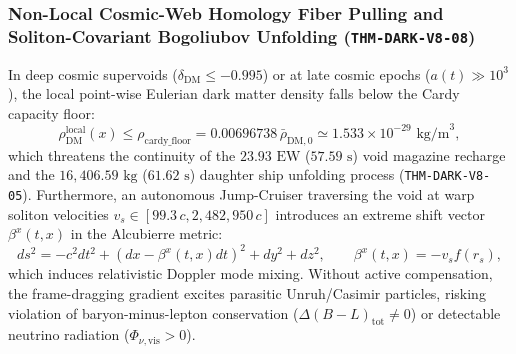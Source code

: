 \documentclass[11pt,onecolumn]{article}
\begin{document}
\subsubsection{Non-Local Cosmic-Web Homology Fiber Pulling and Soliton-Covariant Bogoliubov Unfolding (\texttt{THM-DARK-V8-08})}
\label{subsubsec:thm_dark_v8_08}

In deep cosmic supervoids ($\delta_{\text{DM}} \le -0.995$) or at late cosmic epochs ($a(t) \gg 10^3$), the local point-wise Eulerian dark matter density falls below the Cardy capacity floor:
\begin{equation}
\rho_{\text{DM}}^{\text{local}}(x) \le \rho_{\text{cardy\_floor}} = 0.00696738\,\bar{\rho}_{\text{DM},0} \simeq 1.533 \times 10^{-29}\text{ kg/m}^3,
\end{equation}
which threatens the continuity of the $23.93\text{ EW}$ ($57.59\text{ s}$) void magazine recharge and the $16,406.59\text{ kg}$ ($61.62\text{ s}$) daughter ship unfolding process (\texttt{THM-DARK-V8-05}). Furthermore, an autonomous Jump-Cruiser traversing the void at warp soliton velocities $v_s \in [99.3\,c, 2{,}482{,}950\,c]$ introduces an extreme shift vector $\beta^x(t,x)$ in the Alcubierre metric:
\begin{equation}
ds^2 = -c^2 dt^2 + \left(dx - \beta^x(t,x)dt\right)^2 + dy^2 + dz^2, \qquad \beta^x(t,x) = -v_s f(r_s),
\end{equation}
which induces relativistic Doppler mode mixing. Without active compensation, the frame-dragging gradient excites parasitic Unruh/Casimir particles, risking violation of baryon-minus-lepton conservation ($\Delta(B-L)_{\text{tot}} \neq 0$) or detectable neutrino radiation ($\Phi_{\nu,\text{vis}} > 0$).
\end{document}
